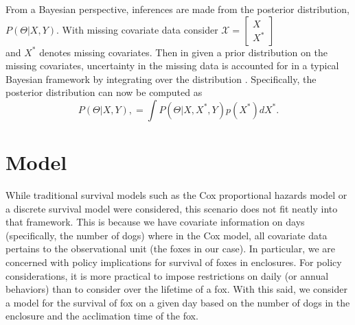 \documentclass[aoas,preprint]{imsart}
\numberwithin{equation}{section}
\theoremstyle{plain}
\begin{document}
From a Bayesian perspective, inferences are made from the posterior distribution, $P(\Theta|X,Y).$ With missing covariate data consider $
	\mathcal{X}=\left[
	\begin{array}{ll}
	X \\
	X^{*} 
	\end{array}
	\right]$ \\ 
	and $X^{*}$ denotes missing covariates. Then in given a prior distribution on the missing covariates, uncertainty in the missing data is accounted for in a typical Bayesian framework by integrating over the distribution \citep{boone2009}. Specifically, the posterior distribution can now be computed as $$P(\Theta|X,Y), = \int P(\Theta|X,X^{*},Y) p(X^{*}) dX^{*}.$$

\section{Model} While traditional survival models such as the Cox proportional hazards model \citep{cox} or a discrete survival model were considered, this scenario does not fit neatly into that framework. This is because we have covariate information on days (specifically, the number of dogs) where in the Cox model, all covariate data pertains to the observational unit (the foxes in our case). In particular, we are concerned with policy implications for survival of foxes in enclosures. For policy considerations, it is more practical to impose restrictions on daily (or annual behaviors) than to consider over the lifetime of a fox. With this said, we consider a model for the survival of fox on a given day based on the number of dogs in the enclosure and the acclimation time of the fox.
\end{document}
